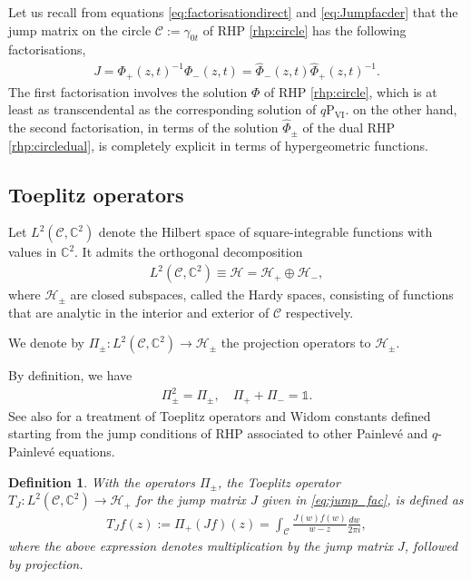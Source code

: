 \documentclass[a4paper,reqno,11pt]{amsart}
\numberwithin{equation}{section}
\numberwithin{figure}{section}
\theoremstyle{plain}
\newtheorem{definition}[theorem]{Definition}
\theoremstyle{remark}
\newcommand\Psix{\textrm{P}_{\textrm{VI}}}
\newcounter{rhp}
\numberwithin{rhp}{section}
\begin{document}
Let us recall from equations \eqref{eq:factorisationdirect} and \eqref{eq:Jumpfacder} that the jump matrix on the circle $\mathcal{C}:=\gamma_{0t}$ of RHP \ref{rhp:circle} has the following factorisations,
\begin{align}
    J =  \Phi_{+}(z,t)^{-1} \Phi_{-}(z,t)=\widehat{\Phi}_{-}(z,t) \widehat{\Phi}_{+}(z,t)^{-1} .\label{eq:jump_fac}
\end{align}
The first factorisation involves the solution $\Phi$ of RHP \ref{rhp:circle}, which is at least as transcendental as the corresponding solution of $q\Psix$. on the other hand, the second factorisation, in terms of the solution $\widehat{\Phi}_{\pm}$ of the dual  RHP \ref{rhp:circledual}, is completely explicit in terms of hypergeometric functions. 






\subsection{Toeplitz operators} 

Let $L^2(\mathcal{C}, \mathbb{C}^2)$ denote the Hilbert space of square-integrable functions with values in $\mathbb{C}^2$. It admits the orthogonal decomposition
    \begin{align}\label{eq:orthogonal_decomp}
L^2(\mathcal{C}, \mathbb{C}^2)\equiv \mathcal{H} = \mathcal{H}_{+} \oplus \mathcal{H}_{-} ,
    \end{align}
    where $\mathcal{H}_{\pm}$ are closed subspaces, called the Hardy spaces, consisting of functions that are analytic in the interior and exterior of $\mathcal{C}$ respectively.
    
We denote by $\Pi_{\pm}: L^2(\mathcal{C}, \mathbb{C}^2) \rightarrow \mathcal{H}_{\pm}$ the projection operators to $\mathcal{H}_{\pm}$.

By definition, we have
    \begin{align*}
        \Pi_{\pm}^2 = \Pi_{\pm},\quad \Pi_{+} + \Pi_{-} = \mathbb{1}.
    \end{align*}
See also \cite{CGL2017,desiraju2019tau,gavrylenko2025riemannhilbertproblemsfredholmdeterminants} for a treatment of Toeplitz operators and Widom constants defined starting from the jump conditions of RHP associated to other Painlev\'e and $q$-Painlev\'e equations. 



\begin{definition} With the operators $\Pi_{\pm}$, the Toeplitz operator $T_{J}: L^2(\mathcal{C},\mathbb{C}^2) \to \mathcal{H}_{+}$ for the jump matrix $J$ given in \eqref{eq:jump_fac}, is defined as
    \begin{align}
        T_{J}f(z):= \Pi_{+} (J f)(z)=\int_{\mathcal{C}} \frac{J(w) f(w)}{w-z} \frac{dw}{2\pi i},  \label{def:Toeplitz-op}
    \end{align}
    where the above expression denotes multiplication by the jump matrix $J$, followed by projection. 
\end{definition}
\end{document}
